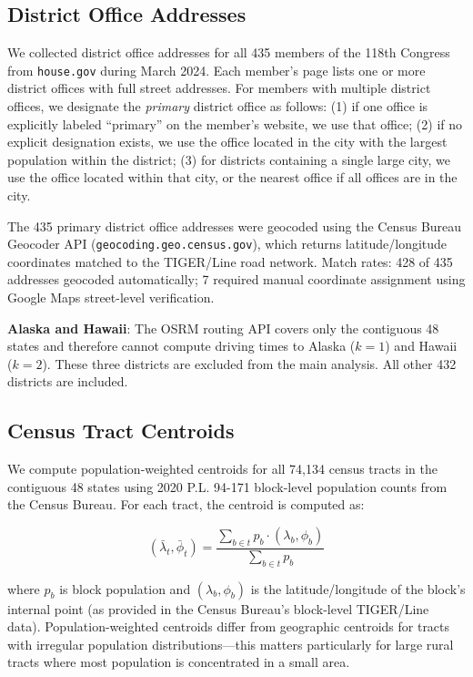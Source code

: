 \label{sec:data}

\subsection{District Office Addresses}

We collected district office addresses for all 435 members of the 118th Congress
from \texttt{house.gov} during March 2024. Each member's page lists one or more
district offices with full street addresses. For members with multiple district offices,
we designate the \textit{primary} district office as follows: (1) if one office is
explicitly labeled ``primary'' on the member's website, we use that office; (2) if
no explicit designation exists, we use the office located in the city with the
largest population within the district; (3) for districts containing a single large
city, we use the office located within that city, or the nearest office if all offices
are in the city.

The 435 primary district office addresses were geocoded using the Census Bureau
Geocoder API (\texttt{geocoding.geo.census.gov}), which returns latitude/longitude
coordinates matched to the TIGER/Line road network. Match rates: 428 of 435 addresses
geocoded automatically; 7 required manual coordinate assignment using Google Maps
street-level verification.

\textbf{Alaska and Hawaii}: The OSRM routing API covers only the contiguous 48 states
and therefore cannot compute driving times to Alaska ($k=1$) and Hawaii ($k=2$).
These three districts are excluded from the main analysis. All other 432 districts
are included.

\subsection{Census Tract Centroids}

We compute population-weighted centroids for all 74,134 census tracts in the
contiguous 48 states using 2020 P.L. 94-171 block-level population counts from
the Census Bureau. For each tract, the centroid is computed as:

\begin{equation}
(\bar{\lambda}_t, \bar{\phi}_t) = \frac{\sum_{b \in t} p_b \cdot (\lambda_b, \phi_b)}{\sum_{b \in t} p_b}
\end{equation}

where $p_b$ is block population and $(\lambda_b, \phi_b)$ is the latitude/longitude
of the block's internal point (as provided in the Census Bureau's block-level
TIGER/Line data). Population-weighted centroids differ from geographic centroids for
tracts with irregular population distributions---this matters particularly for large
rural tracts where most population is concentrated in a small area.

